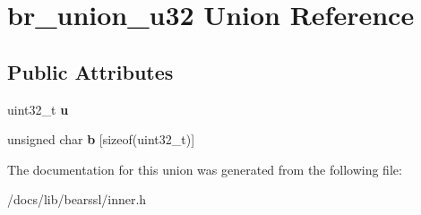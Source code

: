 \hypertarget{unionbr__union__u32}{}\section{br\+\_\+union\+\_\+u32 Union Reference}
\label{unionbr__union__u32}
\subsection*{Public Attributes}
\begin{DoxyCompactItemize}
\item 
\mbox{\label{unionbr__union__u32_ade16e47caaa6f74799a9dee82a5e37ec}} 
uint32\+\_\+t {\bfseries u}
\item 
\mbox{\label{unionbr__union__u32_aae2a79096a018e4c90ca85cf4cbcf501}} 
unsigned char {\bfseries b} \mbox{[}sizeof(uint32\+\_\+t)\mbox{]}
\end{DoxyCompactItemize}


The documentation for this union was generated from the following file\+:\begin{DoxyCompactItemize}
\item 
/docs/lib/bearssl/inner.\+h\end{DoxyCompactItemize}
